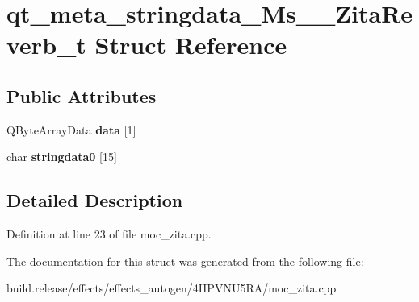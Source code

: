 \hypertarget{structqt__meta__stringdata___ms_____zita_reverb__t}{}\section{qt\+\_\+meta\+\_\+stringdata\+\_\+\+Ms\+\_\+\+\_\+\+Zita\+Reverb\+\_\+t Struct Reference}
\label{structqt__meta__stringdata___ms_____zita_reverb__t}
\subsection*{Public Attributes}
\begin{DoxyCompactItemize}
\item 
\mbox{\label{structqt__meta__stringdata___ms_____zita_reverb__t_abd70e66f3c54fdc9aca896099a42bd9a}} 
Q\+Byte\+Array\+Data {\bfseries data} \mbox{[}1\mbox{]}
\item 
\mbox{\label{structqt__meta__stringdata___ms_____zita_reverb__t_a8d53aee3a80986d56d53ede6e09dfd1c}} 
char {\bfseries stringdata0} \mbox{[}15\mbox{]}
\end{DoxyCompactItemize}


\subsection{Detailed Description}


Definition at line 23 of file moc\+\_\+zita.\+cpp.



The documentation for this struct was generated from the following file\+:\begin{DoxyCompactItemize}
\item 
build.\+release/effects/effects\+\_\+autogen/4\+I\+I\+P\+V\+N\+U5\+R\+A/moc\+\_\+zita.\+cpp\end{DoxyCompactItemize}
